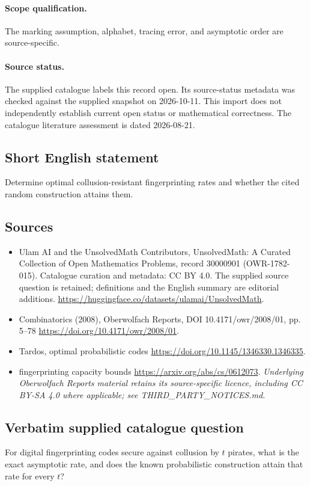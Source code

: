 \documentclass[11pt]{article}
\begin{document}
\paragraph{Scope qualification.}
The marking assumption, alphabet, tracing error, and asymptotic order are source-specific.
\paragraph{Source status.}
The supplied catalogue labels this record open. Its source-status metadata was checked against the supplied snapshot on 2026-10-11. This import does not independently establish current open status or mathematical correctness. The catalogue literature assessment is dated 2026-08-21.
\subsection{Short English statement}
Determine optimal collusion-resistant fingerprinting rates and whether the cited random construction attains them.
\subsection{Sources}
\begin{itemize}
\item[S1] Ulam AI and the UnsolvedMath Contributors, UnsolvedMath: A Curated Collection of Open Mathematics Problems, record 30000901 (OWR-1782-015). Catalogue curation and metadata: CC BY 4.0. The supplied source question is retained; definitions and the English summary are editorial additions.
\url{https://huggingface.co/datasets/ulamai/UnsolvedMath}.
\item[S2] Combinatorics (2008), Oberwolfach Reports, DOI 10.4171/owr/2008/01, pp. 5--78
\url{https://doi.org/10.4171/owr/2008/01}.
\item[S3] Tardos, optimal probabilistic codes
\url{https://doi.org/10.1145/1346330.1346335}.
\item[S4] fingerprinting capacity bounds
\url{https://arxiv.org/abs/cs/0612073}.
\textit{Underlying Oberwolfach Reports material retains its source-specific licence, including CC BY-SA 4.0 where applicable; see THIRD\_PARTY\_NOTICES.md.}
\end{itemize}
\subsection{Verbatim supplied catalogue question}
For digital fingerprinting codes secure against collusion by $t$ pirates, what is the exact asymptotic rate, and does the known probabilistic construction attain that rate for every $t$?
\end{document}
